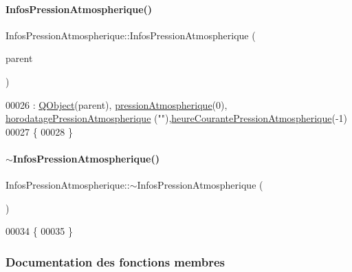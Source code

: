 \paragraph{\texorpdfstring{Infos\+Pression\+Atmospherique()}{InfosPressionAtmospherique()}}
{\footnotesize\ttfamily Infos\+Pression\+Atmospherique\+::\+Infos\+Pression\+Atmospherique (\begin{DoxyParamCaption}\item[{\hyperlink{class_q_object}{Q\+Object} $\ast$}]{parent }\end{DoxyParamCaption})}


\begin{DoxyCode}
00026                                                                      : \hyperlink{class_q_object}{QObject}(parent), 
      \hyperlink{class_infos_pression_atmospherique_a69f31dc0d0ef59f8ced23e4663ee1ab8}{pressionAtmospherique}(0), \hyperlink{class_infos_pression_atmospherique_aba207458a51a9290e4f2e0795983a44e}{horodatagePressionAtmospherique}
      (\textcolor{stringliteral}{""}),\hyperlink{class_infos_pression_atmospherique_ab3fa5c89841cf03f371ef7848b8bc958}{heureCourantePressionAtmospherique}(-1)
00027 \{
00028 \}
\end{DoxyCode}
\mbox{\label{class_infos_pression_atmospherique_a3f4d667523391ceb3c2342c70a3ee41f}} 
\paragraph{\texorpdfstring{$\sim$\+Infos\+Pression\+Atmospherique()}{~InfosPressionAtmospherique()}}
{\footnotesize\ttfamily Infos\+Pression\+Atmospherique\+::$\sim$\+Infos\+Pression\+Atmospherique (\begin{DoxyParamCaption}{ }\end{DoxyParamCaption})}


\begin{DoxyCode}
00034 \{
00035 \}
\end{DoxyCode}


\subsubsection{Documentation des fonctions membres}
\mbox{\label{class_infos_pression_atmospherique_a287f1f24726218868c8531365c1a22ec}} 
